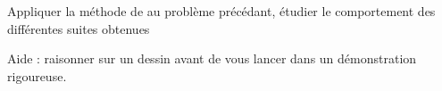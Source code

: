 
\begin{exercice}\label{exoSerieDeux0006}

	Appliquer la méthode de  au problème précédant, étudier le comportement des différentes suites obtenues 

Aide : raisonner sur un dessin avant de vous lancer dans un démonstration rigoureuse.

\end{exercice}
